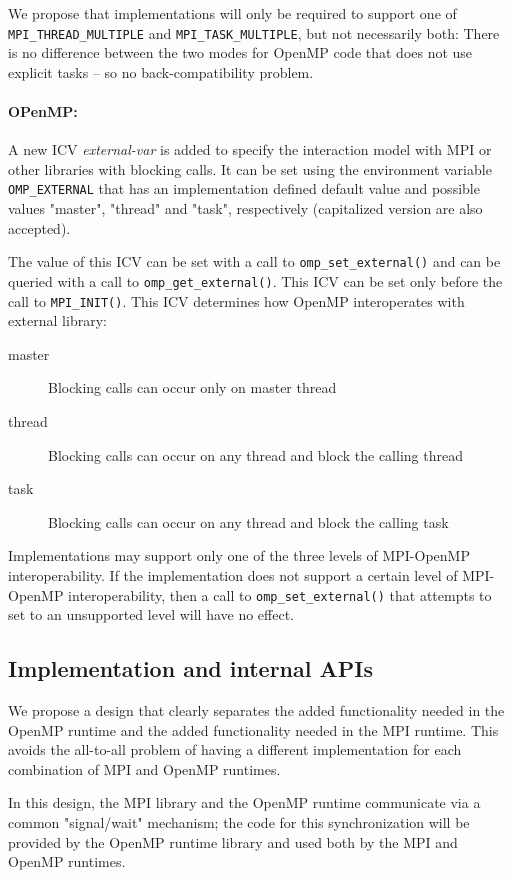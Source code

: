 We propose that implementations will only be required to support one of 
\texttt{MPI\_THREAD\_MULTIPLE} and \texttt{MPI\_TASK\_MULTIPLE}, but not 
necessarily both: There is no difference between the two modes for OpenMP code 
that does not use explicit tasks -- so no back-compatibility problem. 


\paragraph{OPenMP:}
A new ICV \emph{external-var} is added to specify the interaction model with 
MPI or other libraries with blocking calls.
It can be set using the environment variable \texttt{OMP\_EXTERNAL} that has 
an implementation defined default 
 value and possible values  "master", 
"thread" and "task", respectively (capitalized version are 
also accepted).

The value of this ICV can be set with a call to \texttt{omp\_set\_external()} 
and 
can 
be queried with a call to \texttt{omp\_get\_external()}. This ICV can be 
set 
only before the call to \texttt{MPI\_INIT()}. This ICV determines how OpenMP 
interoperates with external library: 
\begin{description}
	\item[master] Blocking calls can occur only on master thread
	\item[thread] Blocking calls can occur on any thread and block the calling 
	thread
	\item[task] Blocking calls can occur on any thread and block the calling 
	task
\end{description}

Implementations may support only one of the three levels of MPI-OpenMP 
interoperability. If the implementation does not support a certain level of 
MPI-OpenMP interoperability, then a call to \texttt{omp\_set\_external()} that 
attempts to set to an unsupported level will have no effect.

\subsection{Implementation and internal APIs}
We propose a design that clearly separates the added functionality needed in 
the OpenMP runtime and the added functionality needed in the MPI runtime. This 
avoids the all-to-all problem of having a different implementation for each 
combination of MPI and OpenMP runtimes. 

In this design, the MPI library and the OpenMP runtime communicate via a 
common "signal/wait" mechanism; the code for this synchronization will be 
provided by the OpenMP runtime library and used both by the MPI and OpenMP 
runtimes.

